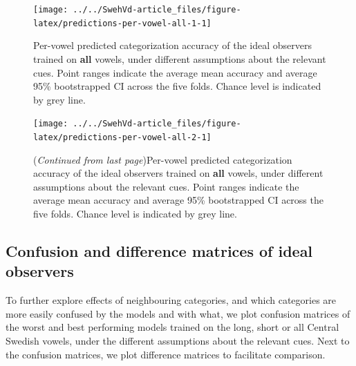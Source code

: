 \documentclass[utf8]{frontiers_suppmat} %
\begin{document}
\begin{figure}

{\centering \texttt{[image: ../../SwehVd-article\_files/figure-latex/predictions-per-vowel-all-1-1]} 

}

\caption{Per-vowel predicted categorization accuracy of the ideal observers trained on \textbf{all} vowels, under different assumptions about the relevant cues. Point ranges indicate the average mean accuracy and average 95\% bootstrapped CI across the five folds. Chance level is indicated by grey line.}\label{fig:predictions-per-vowel-all-1}
\end{figure}



\begin{figure}

{\centering \texttt{[image: ../../SwehVd-article\_files/figure-latex/predictions-per-vowel-all-2-1]} 

}

\caption{(\emph{Continued from last page})Per-vowel predicted categorization accuracy of the ideal observers trained on \textbf{all} vowels, under different assumptions about the relevant cues. Point ranges indicate the average mean accuracy and average 95\% bootstrapped CI across the five folds. Chance level is indicated by grey line.}\label{fig:predictions-per-vowel-all-2}
\end{figure}

\newpage

\hypertarget{sec:confusion}{%
\subsection{Confusion and difference matrices of ideal observers}\label{sec:confusion}}

To further explore effects of neighbouring categories, and which categories are more easily confused by the models and with what, we plot confusion matrices of the worst and best performing models trained on the long, short or all Central Swedish vowels, under the different assumptions about the relevant cues. Next to the confusion matrices, we plot difference matrices to facilitate comparison.
\end{document}
